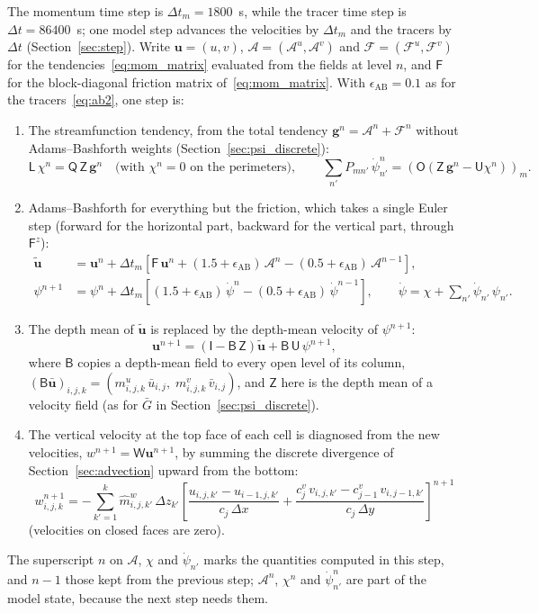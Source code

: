 \documentclass{article}
\begin{document}
The momentum time step is $\Delta t_m = 1800$~s, while the tracer time step is $\Delta t = 86400$~s; one model step advances the velocities by $\Delta t_m$ and the tracers by $\Delta t$ (Section~\ref{sec:step}).
Write $\mathbf{u} = (u, v)$, $\mathcal{A} = (\mathcal{A}^u, \mathcal{A}^v)$ and $\mathcal{F} = (\mathcal{F}^u, \mathcal{F}^v)$ for the tendencies~\eqref{eq:mom_matrix} evaluated from the fields at level $n$, and $\mathsf{F}$ for the block-diagonal friction matrix of~\eqref{eq:mom_matrix}. With $\epsilon_\text{AB} = 0.1$ as for the tracers~\eqref{eq:ab2}, one step is:
\begin{enumerate}
\item The streamfunction tendency, from the total tendency $\mathbf{g}^n = \mathcal{A}^n + \mathcal{F}^n$ without Adams--Bashforth weights (Section~\ref{sec:psi_discrete}):
\[
\mathsf{L}\,\chi^n = \mathsf{Q}\,\mathsf{Z}\,\mathbf{g}^n \quad\text{(with $\chi^n = 0$ on the perimeters)},
\qquad
\sum_{n'} P_{mn'}\,\dot\psi^n_{n'} = \left( \mathsf{O}\left( \mathsf{Z}\,\mathbf{g}^n - \mathsf{U}\chi^n \right) \right)_m .
\]
\item Adams--Bashforth for everything but the friction, which takes a single Euler step (forward for the horizontal part, backward for the vertical part, through $\mathsf{F}^z$):
\begin{align*}
\tilde{\mathbf{u}} &= \mathbf{u}^n + \Delta t_m \left[ \mathsf{F}\,\mathbf{u}^n + (1.5+\epsilon_\text{AB})\,\mathcal{A}^{n} - (0.5+\epsilon_\text{AB})\,\mathcal{A}^{n-1} \right], \\
\psi^{n+1} &= \psi^n + \Delta t_m \left[ (1.5+\epsilon_\text{AB})\,\dot\psi^{n} - (0.5+\epsilon_\text{AB})\,\dot\psi^{n-1} \right],
\qquad \dot\psi = \chi + \sum_{n'} \dot\psi_{n'}\,\psi_{n'} .
\end{align*}
\item The depth mean of $\tilde{\mathbf{u}}$ is replaced by the depth-mean velocity of $\psi^{n+1}$:
\[
\mathbf{u}^{n+1} = \left( \mathsf{I} - \mathsf{B}\,\mathsf{Z} \right)\tilde{\mathbf{u}} + \mathsf{B}\,\mathsf{U}\,\psi^{n+1},
\]
where $\mathsf{B}$ copies a depth-mean field to every open level of its column, $(\mathsf{B}\bar{\mathbf{u}})_{i,j,k} = (m^u_{i,j,k}\,\bar u_{i,j},\; m^v_{i,j,k}\,\bar v_{i,j})$, and $\mathsf{Z}$ here is the depth mean of a velocity field (as for $\bar G$ in Section~\ref{sec:psi_discrete}).
\item The vertical velocity at the top face of each cell is diagnosed from the new velocities, $w^{n+1} = \mathsf{W}\mathbf{u}^{n+1}$, by summing the discrete divergence of Section~\ref{sec:advection} upward from the bottom:
\[
w^{n+1}_{i,j,k} = -\sum_{k'=1}^{k} \hat m^w_{i,j,k'}\,\Delta z_{k'} \left[ \frac{u_{i,j,k'} - u_{i-1,j,k'}}{c_j\,\Delta x} + \frac{c^v_j\,v_{i,j,k'} - c^v_{j-1}\,v_{i,j-1,k'}}{c_j\,\Delta y} \right]^{n+1}
\]
(velocities on closed faces are zero).
\end{enumerate}
The superscript $n$ on $\mathcal{A}$, $\chi$ and $\dot\psi_{n'}$ marks the quantities computed in this step, and $n-1$ those kept from the previous step; $\mathcal{A}^n$, $\chi^n$ and $\dot\psi^n_{n'}$ are part of the model state, because the next step needs them.
\end{document}
